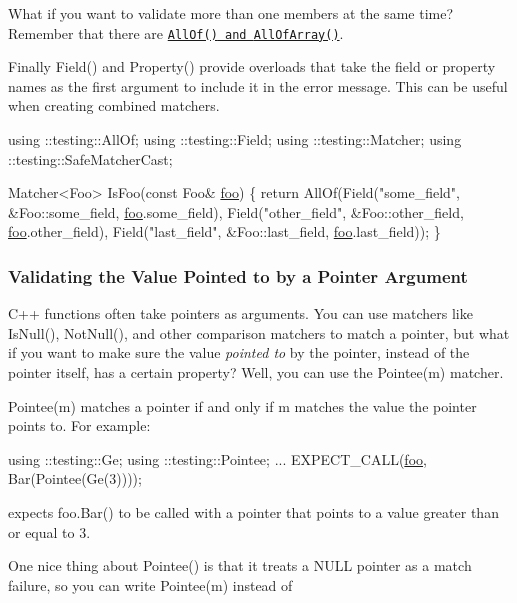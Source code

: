 What if you want to validate more than one members at the same time? Remember that there are \href{#CombiningMatchers}{\tt {\ttfamily All\+Of()} and {\ttfamily All\+Of\+Array()}}.

Finally {\ttfamily Field()} and {\ttfamily Property()} provide overloads that take the field or property names as the first argument to include it in the error message. This can be useful when creating combined matchers.


\begin{DoxyCode}
using ::testing::AllOf;
using ::testing::Field;
using ::testing::Matcher;
using ::testing::SafeMatcherCast;

Matcher<Foo> IsFoo(\textcolor{keyword}{const} Foo& \mbox{\hyperlink{namespacefoo}{foo}}) \{
  \textcolor{keywordflow}{return} AllOf(Field(\textcolor{stringliteral}{"some\_field"}, &Foo::some\_field, \mbox{\hyperlink{namespacefoo}{foo}}.some\_field),
               Field(\textcolor{stringliteral}{"other\_field"}, &Foo::other\_field, \mbox{\hyperlink{namespacefoo}{foo}}.other\_field),
               Field(\textcolor{stringliteral}{"last\_field"}, &Foo::last\_field, \mbox{\hyperlink{namespacefoo}{foo}}.last\_field));
\}
\end{DoxyCode}


\subsubsection*{Validating the Value Pointed to by a Pointer Argument}

C++ functions often take pointers as arguments. You can use matchers like {\ttfamily Is\+Null()}, {\ttfamily Not\+Null()}, and other comparison matchers to match a pointer, but what if you want to make sure the value {\itshape pointed to} by the pointer, instead of the pointer itself, has a certain property? Well, you can use the {\ttfamily Pointee(m)} matcher.

{\ttfamily Pointee(m)} matches a pointer if and only if {\ttfamily m} matches the value the pointer points to. For example\+:


\begin{DoxyCode}
using ::testing::Ge;
using ::testing::Pointee;
...
  EXPECT\_CALL(\mbox{\hyperlink{namespacefoo}{foo}}, Bar(Pointee(Ge(3))));
\end{DoxyCode}


expects {\ttfamily foo.\+Bar()} to be called with a pointer that points to a value greater than or equal to 3.

One nice thing about {\ttfamily Pointee()} is that it treats a {\ttfamily N\+U\+LL} pointer as a match failure, so you can write {\ttfamily Pointee(m)} instead of


